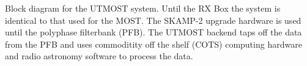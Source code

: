 Block diagram for the UTMOST system. Until the RX Box the system is identical to that used for the MOST. The SKAMP-2 upgrade hardware is used until the polyphase filterbank (PFB). The UTMOST backend taps off the data from the PFB and uses commoditity off the shelf (COTS) computing hardware and radio astronomy software to process the data.